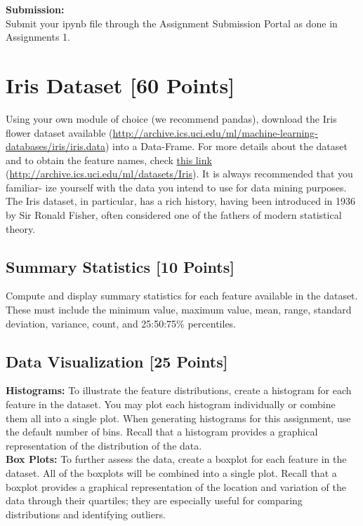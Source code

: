 \documentclass[letter-paper,12pt]{article} %
\begin{document}
\textbf{Submission:}\\
Submit your ipynb file through the Assignment Submission Portal as done in Assignments 1.

\section{Iris Dataset [60 Points]}
Using your own module of choice (we recommend pandas), download the Iris flower dataset available  (\url{http://archive.ics.uci.edu/ml/machine-learning-databases/iris/iris.data}) into a Data-Frame. For more details about the dataset and to obtain the feature names, check \href{http://archive.ics.uci.edu/ml/datasets/Iris}{this link} (\url{http://archive.ics.uci.edu/ml/datasets/Iris}). It is always recommended that you familiar- ize yourself with the data you intend to use for data mining purposes. The Iris dataset, in particular, has a rich history, having been introduced in 1936 by Sir Ronald Fisher, often considered one of the fathers of modern statistical theory.

\subsection{Summary Statistics [10 Points]}
Compute and display summary statistics for each feature available in the dataset. These must include the minimum value, maximum value, mean, range, standard deviation, variance, count, and 25:50:75\% percentiles.

\subsection{Data Visualization [25 Points]}
\textbf{Histograms:} To illustrate the feature distributions, create a histogram for each feature in the dataset. You may plot each histogram individually or combine them all into a single plot. When generating histograms for this assignment, use the default number of bins. Recall that a histogram provides a graphical representation of the distribution of the data.\\

\textbf{Box Plots:} To further assess the data, create a boxplot for each feature in the dataset. All of the boxplots will be combined into a single plot. Recall that a boxplot provides a graphical representation of the location and variation of the data through their quartiles; they are especially useful for comparing distributions and identifying outliers.\\
\end{document}
